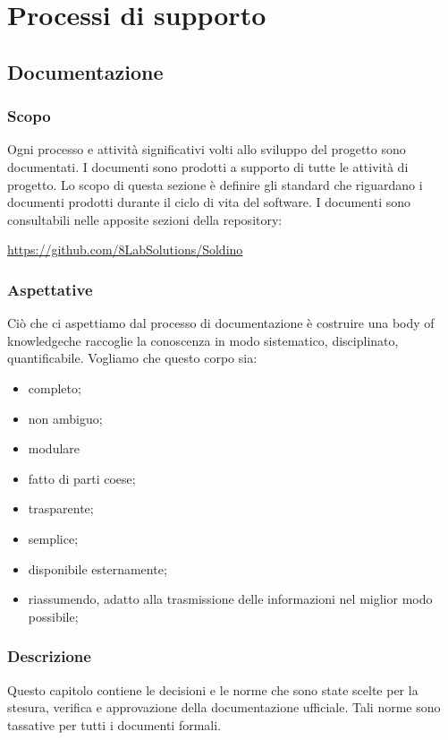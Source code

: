 \section{Processi di supporto}

\subsection{Documentazione}
	\subsubsection{Scopo}
	Ogni processo e attività significativi volti allo sviluppo del progetto sono documentati. I documenti sono prodotti a supporto di tutte le attività di progetto. Lo scopo di questa sezione è definire gli standard che riguardano i documenti prodotti durante il ciclo di vita del software.
	I documenti sono consultabili nelle apposite sezioni della repository\glo:\\
	\centerline{\url{https://github.com/8LabSolutions/Soldino}} 		
	\subsubsection{Aspettative}
	Ciò che ci aspettiamo dal processo di documentazione è costruire una body of knowledge\glosp che raccoglie la conoscenza in modo sistematico, disciplinato, quantificabile. Vogliamo che questo corpo sia:
	\begin{itemize}
		\item completo;
		\item non ambiguo;
		\item modulare
		\item fatto di parti coese;
		\item trasparente;
		\item semplice;
		\item disponibile esternamente;
		\item riassumendo, adatto alla trasmissione delle informazioni nel miglior modo possibile;
	\end{itemize}

	\subsubsection{Descrizione}
	Questo capitolo contiene le decisioni e le norme che sono state scelte per la
	stesura, verifica e approvazione della documentazione ufficiale.  Tali norme  sono  tassative  per  tutti  i  documenti  formali.
